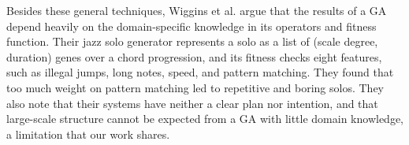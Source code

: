 Besides these general techniques, Wiggins et al. \cite{wiggins1998} argue that the results of a GA depend heavily on the domain-specific knowledge in its operators and fitness function. Their jazz solo generator represents a solo as a list of (scale degree, duration) genes over a chord progression, and its fitness checks eight features, such as illegal jumps, long notes, speed, and pattern matching. They found that too much weight on pattern matching led to repetitive and boring solos. They also note that their systems have neither a clear plan nor intention, and that large-scale structure cannot be expected from a GA with little domain knowledge, a limitation that our work shares.
